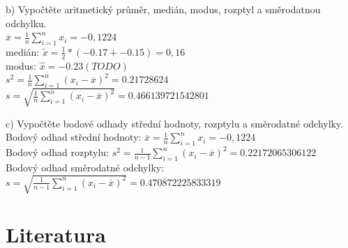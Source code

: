 \documentclass[11pt,a4paper]{article}
\begin{document}
\noindent\makebox[\linewidth]{\rule{\textwidth}{0.4pt}}

b) Vypočtěte aritmetický průměr, medián, modus, rozptyl a směrodatnou odchylku. \\

$ \overline{x} = \frac{1}{n} \sum\limits_{i=1}^n x_i = -0,1224$ \\

medián: $  \widetilde{x} = \frac{1}{2}*(-0.17 + -0.15) = 0,16 $ \\

modus: $ \widehat{x} = -0.23 (TODO) $ \\

$ s^2 = \frac{1}{n} \sum\limits_{i=1}^{n} (x_i - \overline{x})^2 = 0.21728624 $ \\

$ s = \sqrt{\frac{1}{n} \sum\limits_{i=1}^n (x_i - \overline{x})^2} = 0.466139721542801$ \\


\noindent\makebox[\linewidth]{\rule{\textwidth}{0.4pt}}

c) Vypočtěte bodové odhady střední hodnoty, rozptylu a směrodatné odchylky. \\

Bodový odhad střední hodnoty: $ \overline{x} = \frac{1}{n} \sum\limits_{i=1}^{n} x_i = -0,1224 $ \\

Bodový odhad rozptylu: $ s^2 = \frac{1}{n - 1} \sum\limits_{i=1}^{n} (x_i - \overline{x})^2 = 0.22172065306122 $ \\

Bodový odhad směrodatné odchylky: $ s = \sqrt{ \frac{1}{n - 1} \sum\limits_{i=1}^{n} (x_i - \overline{x})^2 } = 0.470872225833319 $ \\







\newpage

\section{Literatura}

\begin{flushleft}
    
\end{flushleft}
\end{document}
